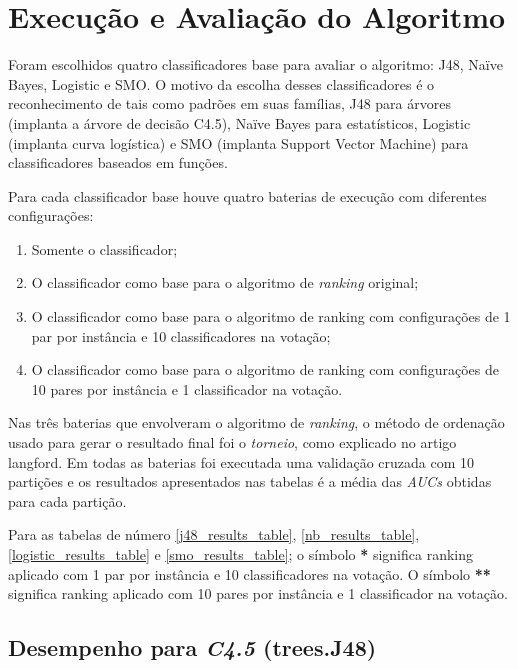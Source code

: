 \section{Execução e Avaliação do Algoritmo}

Foram escolhidos quatro classificadores base para avaliar o algoritmo: J48, Naïve Bayes, Logistic e SMO. O motivo da escolha desses classificadores é o reconhecimento de tais como padrões em suas famílias, J48 para árvores (implanta a árvore de decisão C4.5), Naïve Bayes para estatísticos, Logistic (implanta curva logística) e SMO (implanta Support Vector Machine) para classificadores baseados em funções.

Para cada classificador base houve quatro baterias de execução com diferentes configurações:

\begin{enumerate}

    \item Somente o classificador;
    \item O classificador como base para o algoritmo de \emph{ranking} original;
    \item O classificador como base para o algoritmo de ranking com configurações de 1 par por instância e 10 classificadores na votação;
    \item O classificador como base para o algoritmo de ranking com configurações de 10 pares por instância e 1 classificador na votação.

\end{enumerate}

Nas três baterias que envolveram o algoritmo de \emph{ranking}, o método de ordenação usado para gerar o resultado final foi o \emph{torneio}, como explicado no artigo {{langford}}. Em todas as baterias foi executada uma validação cruzada com 10 partições e os resultados apresentados nas tabelas é a média das \emph{AUCs} obtidas para cada partição.

Para as tabelas de número \ref{j48_results_table}, \ref{nb_results_table}, \ref{logistic_results_table} e \ref{smo_results_table}; o símbolo \textbf{*} significa ranking aplicado com 1 par por instância e 10 classificadores na votação. O símbolo \textbf{**} significa ranking aplicado com 10 pares por instância e 1 classificador na votação.


\subsection{Desempenho para \emph{C4.5} (trees.J48)}


